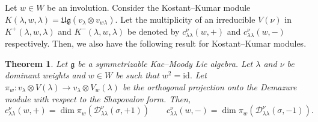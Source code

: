 \documentclass[12pt,reqno]{amsart}
\theoremstyle{plain}
\newtheorem{theorem}{Theorem}[section]
\theoremstyle{definition}
\theoremstyle{plain}
\newcommand{\lie}{\mathfrak}
\begin{document}
\subsection{} Let $w\in W$ be an involution. Consider the Kostant--Kumar module $K(\lambda,w,\lambda)=\mathfrak{Ug} (v_\lambda\otimes v_{w\lambda}).$ 
Let the multiplicity of an irreducible $V(\nu)$ in $K^+(\lambda,w,\lambda)$ and $K^-(\lambda,w,\lambda)$ be denoted by $c_{\lambda\lambda}^{\nu}(w,+)$ and $c_{\lambda\lambda}^{\nu}(w,-)$ respectively.
Then, we also have the following result for Kostant--Kumar modules.
\begin{theorem}\label{mainw}
    Let $\lie g$ be a symmetrizable Kac--Moody Lie algebra. Let $\lambda$ and $\nu$ be dominant weights and $w\in W$ be such that $w^2=\text{id}. $ Let $\pi_w:v_\lambda\otimes V(\lambda)\to v_\lambda\otimes V_w(\lambda)$ be the orthogonal projection onto the Demazure module with respect to the Shapovalov form. Then,
    \[
c^{\nu}_{\lambda\lambda}(w,+)=\dim \pi_w(\mathcal{D}_{\lambda\lambda}^{\nu}(\sigma,+1))
\qquad
c^{\nu}_{\lambda\lambda}(w,-)=\dim\pi_w(\mathcal{D}_{\lambda\lambda}^{\nu}(\sigma,-1)).
\] 
\end{theorem}
\end{document}

